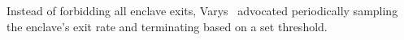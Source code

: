 Instead of forbidding all enclave exits, Varys~\cite{oleksenko2018varys} advocated periodically sampling the enclave's exit rate and terminating based on a set threshold.












